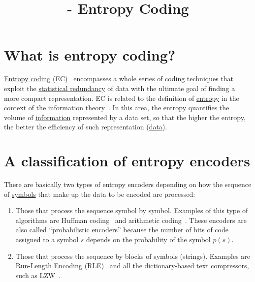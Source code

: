 


\title{\SM{} - Entropy Coding}

\maketitle

\tableofcontents

\section{What is entropy coding?}

\href{https://en.wikipedia.org/wiki/Entropy_coding}{Entropy coding}
(EC)~\cite{vruiz__entropy_coding} encompasses a whole series of coding
techniques that exploit the
\href{https://en.wikipedia.org/wiki/Redundancy_(information_theory)}{statistical
  redundancy} of data with the ultimate goal of finding a more compact
representation. EC is related to the definition of
\href{https://en.wikipedia.org/wiki/Entropy_(information_theory)}{entropy}
in the context of the information
theory~\cite{vruiz__information_theory}. In this area, the entropy
quantifies the volume of
\href{https://en.wikipedia.org/wiki/Information}{information}
represented by a data set, so that the higher the entropy, the better
the efficiency of such representation
(\href{https://en.wikipedia.org/wiki/Data}{data}).

\section{A classification of entropy encoders}

There are basically two types of entropy encoders depending on how the
sequence of \href{https://en.wikipedia.org/wiki/Symbol}{symbols} that
make up the data to be encoded are processed:

\begin{enumerate}
\item Those that process the sequence symbol by symbol. Examples of
  this type of algorithms are Huffman
  coding~\cite{vruiz__huffman_coding} and arithmetic
  coding~\cite{vruiz__arithmetic_coding}. These encoders are also
  called ``probabilistic encoders'' because the number of bits of code
  assigned to a symbol $s$ depends on the probability of the symbol
  $p(s)$.
\item Those that process the sequence by blocks of symbols
  (strings). Examples are Run-Length Encoding (RLE)~\cite{vruiz__rle}
  and all the dictionary-based text compressors, such as
  LZW~\cite{vruiz__LZW}.
\end{enumerate}
  

